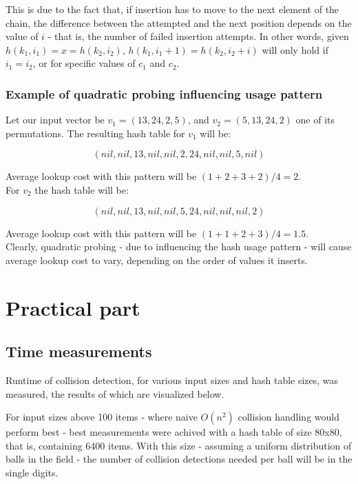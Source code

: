 \documentclass[a4paper]{scrartcl}
\begin{document}
This is due to the fact that, if insertion has to move to the next element of
the chain, the difference between the attempted and the next position depends
on the value of $i$ - that is, the number of failed insertion attempts.  In
other words, given $h(k_1, i_1) = x = h(k_2, i_2)$, $h(k_1, i_1 + 1) = h(k_2,
i_2 + i)$ will only hold if $i_1 = i_2$, or for specific values of $c_1$ and
$c_2$.

\subsubsection{Example of quadratic probing influencing usage pattern}

Let our input vector be $v_1 = (13, 24, 2, 5)$, and $v_2 = (5, 13, 24, 2)$ one
of its permutations. The resulting hash table for $v_1$ will be:

\[
	(nil, nil, 13, nil, nil, 2, 24, nil, nil, 5, nil)
\]

Average lookup cost with this pattern will be $(1 + 2 + 3 + 2) / 4 = 2$.
\\

For $v_2$ the hash table will be:

\[
	(nil, nil, 13, nil, nil, 5, 24, nil, nil, nil, 2)
\]

Average lookup cost with this pattern will be $(1 + 1 + 2 + 3) / 4 = 1.5$.
\\

Clearly, quadratic probing - due to influencing the hash usage pattern - will
cause average lookup cost to vary, depending on the order of values it inserts.

\section{Practical part}

\subsection{Time measurements}

Runtime of collision detection, for various input sizes and hash table sizes,
was measured, the results of which are visualized below.

For input sizes above 100 items - where naive $O(n^2)$ collision handling would
perform best - best measurements were achived with a hash table of size 80x80,
that is, containing 6400 items. With this size - assuming a uniform
distribution of balls in the field - the number of collision detections needed
per ball will be in the single digits.
\end{document}

